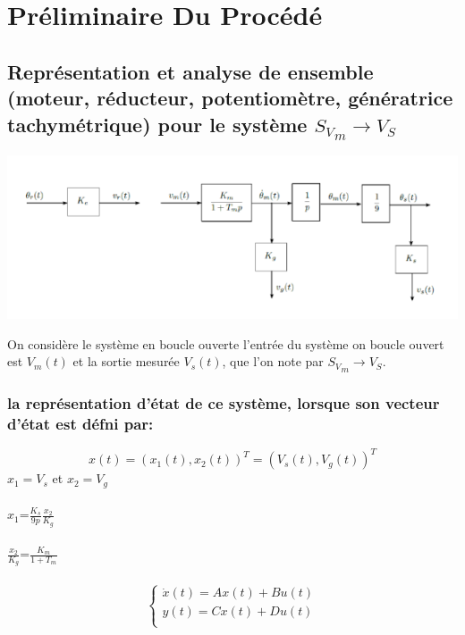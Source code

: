 \chapter{ Préliminaire Du Procédé}
     \section{Représentation et analyse de ensemble (moteur, réducteur, potentiomètre, génératrice        tachymétrique) pour le système $ {S_V}_m \rightarrow V_S$ }
 

\begin{center}
\includegraphics[scale=0.5]{fiiig2.png}
\label{fig1} 
\end{center}

On considère le système en boucle ouverte l’entrée du système on boucle ouvert est $V_m(t)$ et la sortie mesurée $V_s(t)$, que l’on note  par $ {S_V}_m \rightarrow V_S$.


\subsection{la représentation d’état de ce système, lorsque son vecteur d’état est défni par:}


\begin{equation}
x(t)={(x_1(t),x_2(t))}^T={(V_s(t),V_g(t))}^T
\end{equation}
$x_1=V_s$ et $x_2=V_g$
\\\\


$x_1$=$\frac{K_s}{9p}\frac{x_2}{K_g}$\\\\
$\frac{x_2}{K_g}$=$\frac{K_m}{1+T_m}$
\\
\\

\begin{equation*}
\left\{\begin{matrix}
\dot{x}(t)=Ax(t)+Bu(t)\\ 
y(t)=Cx(t)+Du(t)\\
\end{matrix}\right.
\end{equation*}   

